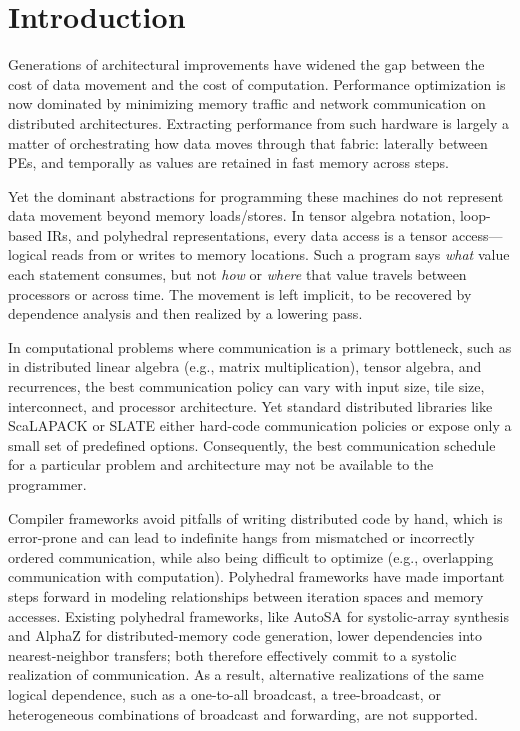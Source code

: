 \documentclass[sigplan, nonacm]{acmart}
\begin{document}
\section{Introduction}
\label{sec:intro}

Generations of architectural improvements have widened the gap between the cost
of data movement and the cost of computation. Performance optimization is now
dominated by minimizing memory traffic and network communication on distributed architectures. %
Extracting performance from such hardware is largely a matter of orchestrating how data
moves through that fabric: laterally between PEs, and temporally as values are
retained in fast memory across steps.

Yet the dominant abstractions for programming these machines do not represent data
movement beyond memory loads/stores. In tensor algebra notation, loop-based IRs, and polyhedral representations, every
data access is a tensor access---logical reads from or writes to memory
locations. Such a program says \emph{what} value each statement consumes, but
not \emph{how} or \emph{where} that value travels between processors or across
time. The movement is left implicit, to be recovered by dependence analysis and
then realized by a lowering pass.

In computational problems where communication is a primary bottleneck, such as in distributed linear algebra (e.g., matrix multiplication), tensor algebra, and recurrences, the best communication policy can vary with input size, tile size, interconnect, and processor architecture. Yet standard distributed libraries like ScaLAPACK \citep{choi1992scalapack} or SLATE \citep{gates2019slate} either hard-code communication policies or expose only a small set of predefined options. Consequently, the best communication schedule for a particular problem and architecture may not be available to the programmer.



Compiler frameworks avoid pitfalls of writing distributed code by hand, which is error-prone and can lead to indefinite hangs from mismatched or incorrectly ordered communication, while also being difficult to optimize (e.g., overlapping communication with computation).
Polyhedral frameworks have made important steps forward in modeling relationships between iteration spaces and memory accesses. Existing polyhedral frameworks, like AutoSA \citep{autosa} for systolic-array synthesis and AlphaZ for distributed-memory code generation,\cite{alphaz} lower dependencies into nearest-neighbor transfers; both therefore effectively commit to a systolic realization of communication. As a result, alternative realizations of the same logical dependence, such as a one-to-all broadcast, a tree-broadcast, or heterogeneous combinations of broadcast and forwarding, are not supported.
\end{document}

